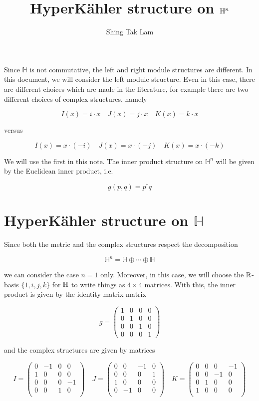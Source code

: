 \documentclass{article}
\title{HyperK\"ahler structure on \(\bH^n\)}
\author{Shing Tak Lam}
\newcommand{\bH}{\mathbb H}
\begin{document}
\maketitle

Since \(\bH\) is not commutative, the left and right module structures are different. In this document, we will consider the left module structure. Even in this case, there are different choices which are made in the literature, for example there are two different choices of complex structures, namely

\[I(x) = i \cdot x \quad J(x) = j \cdot x \quad K(x) = k\cdot x\]

versus

\[I(x) = x \cdot (-i) \quad J(x) = x \cdot (-j) \quad K(x) = x \cdot (-k)\]

We will use the first in this note. The inner product structure on \(\bH^n\) will be given by the Euclidean inner product, i.e.

\[g(p, q) = p^\dagger q\]

\section{HyperK\"ahler structure on \(\bH\)}

Since both the metric and the complex structures respect the decomposition

\[\bH^n = \bH \oplus \cdots \oplus \bH\]

we can consider the case \(n =1\) only. Moreover, in this case, we will choose the \(\mathbb{R}\)-basis \(\{1, i, j, k\}\) for \(\mathbb{H}\) to write things as \(4 \times 4\) matrices. With this, the inner product is given by the identity matrix matrix

\[g = \begin{pmatrix}
    1 & 0 & 0 & 0 \\
    0 & 1 & 0 & 0 \\
    0 & 0 & 1 & 0 \\
    0 & 0 & 0 & 1
\end{pmatrix}\]

and the complex structures are given by matrices

\[I = \begin{pmatrix}
    0 & -1 & 0 & 0 \\
    1 & 0  & 0 & 0\\
    0 & 0  & 0 & -1\\
    0 & 0  & 1 & 0\\
\end{pmatrix} \quad J = \begin{pmatrix}
    0 & 0 & -1 & 0 \\
    0 & 0 & 0  & 1\\
    1 & 0 & 0  & 0\\
    0 & -1 & 0 & 0\\
\end{pmatrix} \quad K = \begin{pmatrix}
    0 & 0 & 0 & -1 \\
    0 & 0 & -1 & 0\\
    0 & 1 & 0 & 0\\
    1 & 0 & 0 & 0\\
\end{pmatrix}\]
\end{document}

